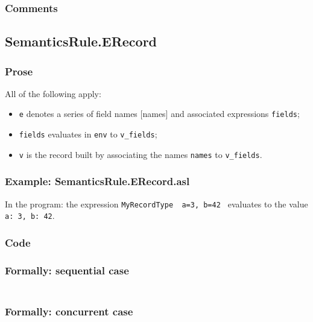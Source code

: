 \documentclass{book}
\begin{document}
  \subsubsection{Comments}

\subsection{SemanticsRule.ERecord \label{sec:SemanticsRule.ERecord}}

  \subsubsection{Prose}
  All of the following apply:
  \begin{itemize}
  \item \texttt{e} denotes a series of field names [names] and associated expressions
    \texttt{fields};
  \item \texttt{fields} evaluates in \texttt{env} to \texttt{v\_fields};
  \item \texttt{v} is the record built by associating the names \texttt{names} to \texttt{v\_fields}.
  \end{itemize}

  \subsubsection{Example: SemanticsRule.ERecord.asl}
    In the program:
    the expression \texttt{MyRecordType { a=3, b=42 }} evaluates to the value \texttt{{a:
3, b: 42}}.

  \subsubsection{Code}

  \subsubsection{Formally: sequential case}
  \begin{align}
  \end{align} 

  \subsubsection{Formally: concurrent case}
  \begin{align}
  \end{align} 
\end{document}
